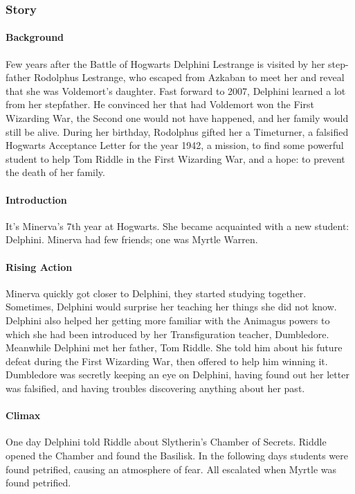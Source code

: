 \subsubsection{Story}

\paragraph{Background}
Few years after the Battle of Hogwarts Delphini Lestrange is visited by her step-father Rodolphus Lestrange, who escaped from Azkaban to meet her and reveal that she was Voldemort's daughter.
Fast forward to 2007, Delphini learned a lot from her stepfather. He convinced her that had Voldemort won the First Wizarding War, the Second one would not have happened, and her family would still be alive. During her birthday, Rodolphus gifted her a Timeturner, a falsified Hogwarts Acceptance Letter for the year 1942, a mission, to find some powerful student to help Tom Riddle in the First Wizarding War, and a hope: to prevent the death of her family. 

\paragraph{Introduction}
It's Minerva's 7th year at Hogwarts. She became acquainted with a new student: Delphini. Minerva had few friends; one was Myrtle Warren.

\paragraph{Rising Action}
Minerva quickly got closer to Delphini, they started studying together. Sometimes, Delphini would surprise her teaching her things she did not know. Delphini also helped her getting more familiar with the Animagus powers to which she had been introduced by her Transfiguration teacher, Dumbledore.
Meanwhile Delphini met her father, Tom Riddle. She told him about his future defeat during the First Wizarding War, then offered to help him winning it.
Dumbledore was secretly keeping an eye on Delphini, having found out her letter was falsified, and having troubles discovering anything about her past.

\paragraph{Climax}
One day Delphini told Riddle about Slytherin's Chamber of Secrets. Riddle opened the Chamber and found the Basilisk. In the following days students were found petrified, causing an atmosphere of fear. All escalated when Myrtle was found petrified.

